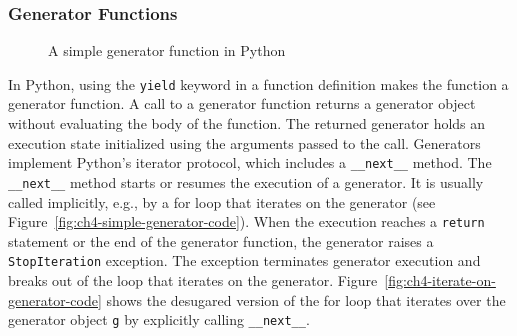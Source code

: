 \subsubsection*{Generator Functions}

\begin{figure}
\centering
{}
\caption{A simple generator function in Python}
\label{fig:ch4-generator-example}
\end{figure}

In Python, using the \texttt{yield} keyword in a function definition makes the function a generator function.
A call to a generator function returns a generator object without evaluating the body of the function.
The returned generator holds an execution state initialized using the arguments passed to the call.
Generators implement Python's iterator protocol, which includes a \texttt{\_\_next\_\_} method.
The \texttt{\_\_next\_\_} method starts or resumes the execution of a generator.
It is usually called implicitly, e.g., by a for loop that iterates on the generator (see Figure~\ref{fig:ch4-simple-generator-code}).
When the execution reaches a \texttt{return} statement or the end of the generator function, the generator raises a \texttt{StopIteration} exception.
The exception terminates generator execution and breaks out of the loop that iterates on the generator.
Figure~\ref{fig:ch4-iterate-on-generator-code} shows the desugared version of the for loop that iterates over the generator object \texttt{g} by explicitly calling \texttt{\_\_next\_\_}.

